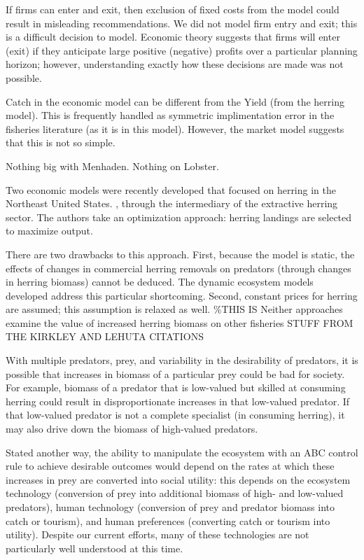\documentclass[]{article}
\begin{document}
If firms can enter and exit, then exclusion of fixed costs from the
model could result in misleading recommendations. We did not model firm
entry and exit; this is a difficult decision to model. Economic theory
suggests that firms will enter (exit) if they anticipate large positive
(negative) profits over a particular planning horizon; however,
understanding exactly how these decisions are made was not possible.

Catch in the economic model can be different from the Yield (from the
herring model). This is frequently handled as symmetric implimentation
error in the fisheries literature (as it is in this model). However, the
market model suggests that this is not so simple.

Nothing big with Menhaden. Nothing on Lobster.

\iffalse  Two economic models were recently developed that focused on
herring in the Northeast United States. , through the intermediary of
the extractive herring sector. The authors take an optimization
approach: herring landings are selected to maximize output.

There are two drawbacks to this approach. First, because the model is
static, the effects of changes in commercial herring removals on
predators (through changes in herring biomass) cannot be deduced. The
dynamic ecosystem models developed address this particular shortcoming.
Second, constant prices for herring are assumed; this assumption is
relaxed as well. \%THIS IS Neither approaches examine the value of
increased herring biomass on other fisheries STUFF FROM THE KIRKLEY AND
LEHUTA CITATIONS

With multiple predators, prey, and variability in the desirability of
predators, it is possible that increases in biomass of a particular prey
could be bad for society. For example, biomass of a predator that is
low-valued but skilled at consuming herring could result in
disproportionate increases in that low-valued predator. If that
low-valued predator is not a complete specialist (in consuming herring),
it may also drive down the biomass of high-valued predators.

Stated another way, the ability to manipulate the ecosystem with an ABC
control rule to achieve desirable outcomes would depend on the rates at
which these increases in prey are converted into social utility: this
depends on the ecosystem technology (conversion of prey into additional
biomass of high- and low-valued predators), human technology (conversion
of prey and predator biomass into catch or tourism), and human
preferences (converting catch or tourism into utility). Despite our
current efforts, many of these technologies are not particularly well
understood at this time.
\end{document}

